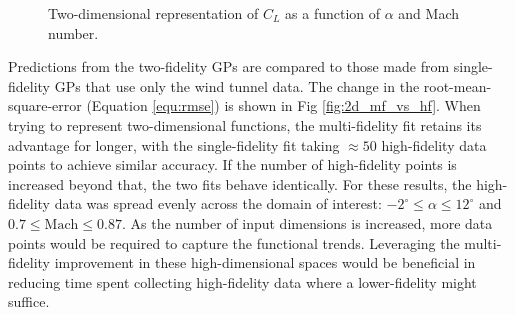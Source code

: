 \begin{figure}
    \centering
    \begin{subfigure}[AVL and wind tunnel data points.] {
        \label{fig:cl_2d_2f_points}
        \texttt{[image: images/cl\_2d\_2f\_points.png]} }
    \end{subfigure}
    \hfill
    \begin{subfigure}[Surfaces representing mean and $2\sigma$ predictions from GP. Red slice shows one-dimensional location for sampling the GP which is shown in \subref{fig:cl_2d_2f_sample}.]{
        \label{fig:cl_2d_2f_surf}
        \texttt{[image: images/cl\_2d\_2f\_surf.png]} 
    }
    \end{subfigure}
    \hfill
    \begin{subfigure}[Zoomed in view of surfaces in \subref{fig:cl_2d_2f_surf} at high angles of attack (and lower Mach number). The mean and $2\sigma$ predictions interval surfaces are more discernible at this scale.]{
        \label{fig:cl_2d_2f_surf_zoom}
        \texttt{[image: images/cl\_2d\_2f\_surf\_zoom.png]} 
    }
    \end{subfigure}
    \hfill
    \begin{subfigure}[One-dimensional representation of mean and $2\sigma$ estimates at slice location shown in \subref{fig:cl_2d_2f_surf}. Multiple samples (colored lines) of the GP are also overlaid to show examples of deterministic sampling. Inset plot focuses in on high angles of attack.]{
        \label{fig:cl_2d_2f_sample}
        \texttt{[image: images/cl\_2d\_2f\_sample.png]} 
    }
    \end{subfigure}
    \caption{Two-dimensional representation of $C_L$ as a function of $\alpha$ and Mach number.\label{fig:2d_2f_cl_data}}
\end{figure}

Predictions from the two-fidelity GPs are compared to those made from single-fidelity GPs that use only the wind tunnel data. The change in the root-mean-square-error (Equation \eqref{equ:rmse}) is shown in Fig \ref{fig:2d_mf_vs_hf}. When trying to represent two-dimensional functions, the multi-fidelity fit retains its advantage for longer, with the single-fidelity fit taking $\approx 50$ high-fidelity data points to achieve similar accuracy. If the number of high-fidelity points is increased beyond that, the two fits behave identically. For these results, the high-fidelity data was spread evenly across the domain of interest: $-2^\circ \leq \alpha \leq 12^\circ$ and $0.7 \leq \text{Mach} \leq 0.87$. As the number of input dimensions is increased, more data points would be required to capture the functional trends. Leveraging the multi-fidelity improvement in these high-dimensional spaces would be beneficial in reducing time spent collecting high-fidelity data where a lower-fidelity might suffice.


